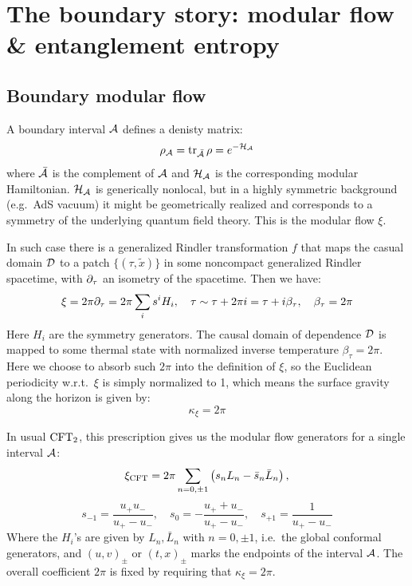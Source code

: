 \documentclass[11pt,a4paper,utf8]{article}
\renewcommand{\tilde}[1]{\ensuremath{\widetilde{#1}}}
\begin{document}
\pagebreak
\section{The boundary story: modular flow \& entanglement entropy}

\subsection{Boundary modular flow}

	A boundary interval $\mathcal{A}$ defines a denisty matrix:
	\begin{equation}
		\rho_{\mathcal{A}}
		= \operatorname{tr}_{\bar{\mathcal{A}}} \rho
		= e^{-\mathcal{H}_{\mathcal{A}}}
	\end{equation}
	where $\bar{\mathcal{A}}$ is the complement of $\mathcal{A}$ and $\mathcal{H}_{\mathcal{A}}$ is the corresponding modular Hamiltonian. $\mathcal{H}_{\mathcal{A}}$ is generically nonlocal, but in a highly symmetric background (e.g.~AdS vacuum) it might be geometrically realized and corresponds to a symmetry of the underlying quantum field theory. This is the modular flow $\xi$. 
	
	In such case there is a generalized Rindler transformation $f$ that maps the casual domain $\mathcal{D}$ to a patch $\{(\tau,\tilde{x})\}$ in some noncompact generalized Rindler spacetime, with $\partial_{\tau}$ an isometry of the spacetime. Then we have:
	\begin{equation}
		\xi = 2\pi \partial_{\tau}
		= 2\pi \sum_i s^i H_i,
	\quad
		\tau \sim \tau + 2\pi i
		= \tau + i\beta_\tau,
	\quad
		\beta_\tau = 2\pi
	\end{equation}
	Here $H_i$ are the symmetry generators. The causal domain of dependence $\mathcal{D}$ is mapped to some thermal state with normalized inverse temperature $\beta_\tau = 2\pi$. Here we choose to absorb such $2\pi$ into the definition of $\xi$, so the Euclidean periodicity w.r.t.~$\xi$ is simply normalized to 1, which means the surface gravity along the horizon is given by:
	\begin{equation}
		\kappa_\xi = 2\pi
	\end{equation}
	
	In usual $\mathrm{CFT}_2$, this prescription gives us the modular flow generators for a single interval $\mathcal{A}$:
	\begin{equation}
		\xi_{\mathrm{CFT}} = 2\pi \sum_{n=0,\pm 1} \left(
				s_n L_n - \bar{s}_n \bar{L}_n
			\right),
	\end{equation}
	\begin{equation}
		s_{-1} = \frac{u_+ u_-}{u_+ - u_-},\quad
		s_0 = - \frac{u_+ + u_-}{u_+ - u_-},\quad
		s_{+1} = \frac{1}{u_+ - u_-}
	\end{equation}
	Where the $H_i$'s are given by $L_n,\bar{L}_n$ with $n=0,\pm 1$, i.e.~the global conformal generators, and $(u,v)_\pm$ or $(t,x)_\pm$ marks the endpoints of the interval $\mathcal{A}$. The overall coefficient $2\pi$ is fixed by requiring that $\kappa_\xi = 2\pi$. 
	
\end{document}
